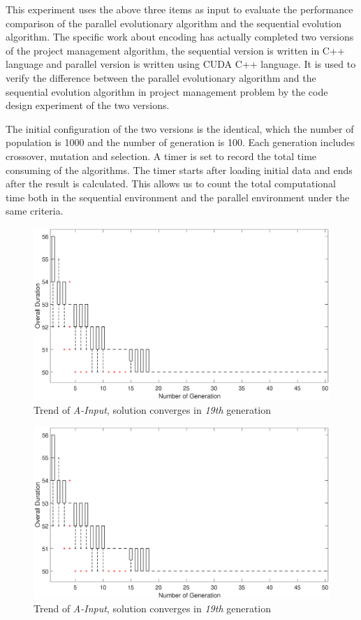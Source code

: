 This experiment uses the above three items as input to evaluate the performance
comparison of the parallel evolutionary algorithm and the sequential evolution
algorithm. The specific work about encoding has actually completed two versions
of the project management algorithm, the sequential version is written in C++
language and parallel version is written using CUDA C++ language. It is used to
verify the difference between the parallel evolutionary algorithm and the sequential
evolution algorithm in project management problem by the code design experiment
of the two versions.


The initial configuration of the two versions is the identical, which the number
of population is 1000 and the number of generation is 100. Each generation
includes crossover, mutation and selection. A timer is set to record the total
time consuming of the algorithms. The timer starts after loading initial data
and ends after the result is calculated. This allows us to count the total
computational time both in the sequential environment and the parallel
environment under the same criteria.

\begin{figure}[!htb]
  \centering
  \includegraphics[width=\textwidth]{figures/fig_pa1.eps}
  \caption{Trend of \emph{A-Input}, solution converges in \emph{19th} generation}
  \label{fig:pa1c}
\end{figure}

\begin{figure}[!htb]
  \centering
  \includegraphics[width=\textwidth]{figures/fig_pa1.eps}
  \caption{Trend of \emph{A-Input}, solution converges in \emph{19th} generation}
  \label{fig:pa2c}
\end{figure}

